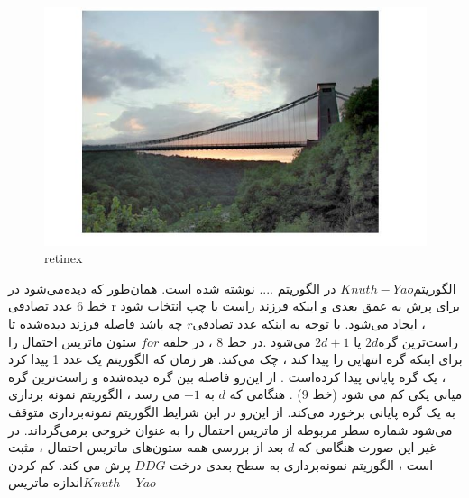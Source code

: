       \begin{figure}[!htb]
      	\includegraphics[width=\linewidth]{images/retinex1}
      	\caption{retinex}\label{fig:logtonemap}
      	\endminipage\hfill
      \end{figure}
الگوریتم$ Knuth-Yao$  در الگوریتم .... نوشته شده است. همان‌طور که دیده‌می‌شود در خط 6  عدد تصادفی r برای پرش به عمق  بعدی و اینکه فرزند راست یا چپ انتخاب شود ، ایجاد می‌شود. با توجه به اینکه عدد تصادفی$ r$  چه باشد فاصله فرزند دیده‌شده تا راست‌ترین گره$ 2d$ یا $2d + 1$  می‌شود .در خط 8 ، در حلقه $for$  ستون ماتریس احتمال  را برای اینکه گره انتهایی را پیدا کند ،  چک می‌کند. هر زمان که الگوریتم یک  عدد 1 پیدا کرد ، یک گره پایانی پیدا کرده‌است   . از این‌رو فاصله بین گره دیده‌شده و راست‌ترین گره میانی یکی کم می شود (خط 9) . هنگامی که $d  $  به $-1$ می رسد ، الگوریتم نمونه برداری به یک گره پایانی برخورد می‌کند. از این‌رو در این شرایط الگوریتم نمونه‌برداری متوقف می‌شود شماره سطر مربوطه از ماتریس احتمال را به عنوان خروجی برمی‌گرداند. در غیر این‌ صورت هنگامی که $d$  بعد از بررسی همه ستون‌های ماتریس احتمال ، مثبت است ، الگوریتم نمونه‌برداری به سطح بعدی درخت $DDG$ پرش می کند. 
کم کردن اندازه ماتریس$ Knuth-Yao$
  
